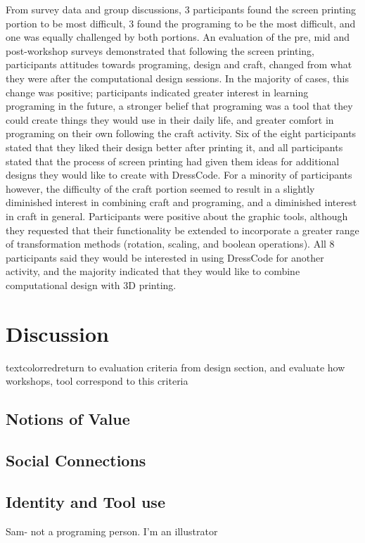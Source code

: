 \documentclass{sigchi}
\begin{document}
From survey data and group discussions, 3 participants found the screen printing portion to be most difficult, 3 found the programing to be the most difficult, and one was equally challenged by both portions. An evaluation of the pre, mid and post-workshop surveys demonstrated that following the screen printing, participants attitudes towards programing, design and craft, changed from what they were after the computational design sessions. In the majority of cases, this change was positive; participants indicated greater interest in learning programing in the future, a stronger belief that programing was a tool that they could create things they would use in their daily life, and greater comfort in programing on their own following the craft activity. Six of the eight participants stated that they liked their design better after printing it, and all participants stated that the process of screen printing had given them ideas for additional designs they would like to create with DressCode. For a minority of participants however, the difficulty of the craft portion seemed to result in a slightly diminished interest in combining craft and programing, and a diminished interest in craft in general. Participants were positive about the graphic tools, although they requested that their functionality be extended to incorporate a greater range of transformation methods (rotation, scaling, and boolean operations). All 8 participants said they would be interested in using DressCode for another activity, and the majority indicated that they would like to combine computational design with 3D printing.

\section{Discussion}
textcolor{red}{return to evaluation criteria from design section, and evaluate how workshops, tool correspond to this criteria}
\subsection{Notions of Value}
\subsection{Social Connections}
\subsection{Identity and Tool use}
Sam- not a programing person. I'm an illustrator
\end{document}

